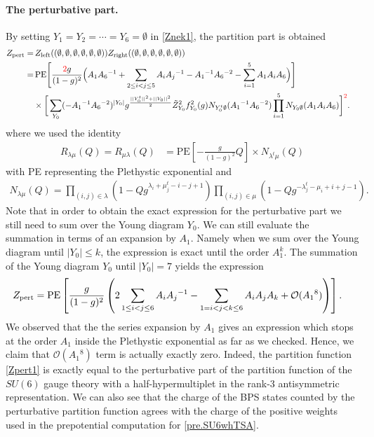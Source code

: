 \documentclass[11pt,a4paper]{article}
\newcommand{\nn}{\nonumber}
\begin{document}
\paragraph{The perturbative part.}
By setting $Y_1=Y_2=\cdots = Y_6 = \emptyset$ in  \eqref{Znek1}, the partition part is obtained 
\begin{align}
Z_{\rm pert} 
=& \,
Z_{\text{left}}( (\emptyset,\emptyset,\emptyset,\emptyset,\emptyset,\emptyset ) )
Z_{\text{right}}( (\emptyset,\emptyset,\emptyset,\emptyset,\emptyset,\emptyset ) )
\cr
=&\, 
\text{PE} \Biggl[ 
\frac{{\color{red}2}g}{(1-g)^2} 
\Bigl( A_1 A_6{}^{-1} 
+ \sum_{2 \le i <  j \le 5} A_i A_j{}^{-1}
- A_1{}^{-1} A_6{}^{-2} 
- \sum_{i=1}^5 A_1 A_i  A_6
\Bigr)
\Biggr]
\cr 
& 
\times \bigg[\sum_{Y_0} ( - A_1{}^{-1} A_6{}^{-2})^{|Y_0|} 
g^{\frac{||Y_0^t||^2+||Y_0||^2}{2}} \tilde{Z}_{Y_0}^2 f_{Y_0}^2(g)
N_{Y_0^t \emptyset } (A_1{}^{-1} A_6{}^{-2})\prod_{i=1}^5 N_{Y_0 \emptyset } (A_1 A_i  A_6)\bigg]^{\color{red}2} .\nn
\end{align}
where we used the identity
\begin{align}
R_{\lambda \mu} (Q)=R_{ \mu\lambda} (Q)
&= \text{PE} \left[ - \frac{g}{(1-g)^2} Q \right]
\times N_{\lambda^t \mu} (Q)
\end{align}
with PE representing the Plethystic exponential
 and 
\begin{align}
N_{\lambda \mu} (Q) 
= \prod_{(i,j) \in \lambda} \left( 1 - Q g^{\lambda_i + \mu_j^t -i-j+1} \right)
\prod_{(i,j) \in \mu} \left( 1 - Q g^{-\lambda^t_j - \mu_i + i + j - 1} \right).
\end{align}
Note that in order to obtain the exact expression for the perturbative part we still need to sum over the Young diagram $Y_0$. We can still evaluate the summation in terms of an expansion by $A_1$. Namely when we sum over the Young diagram until $|Y_0| \leq k$, the expression is exact until the order $A_1^k$. The summation of the Young diagram $Y_0$ until $|Y_0| = 7$ yields the expression  
\begin{align}
Z_{\rm pert} 
&= \text{PE}\left[\frac{g}{(1-g)^2} 
\left( 2\sum_{1 \le i < j \le 6} A_i A_j{}^{-1} 
- \sum_{1 = i < j < k \le 6} A_i A_j A_k
+ \mathcal{O} (A_1{}^8)\right)\right].\label{Zpert1}
\end{align} 
We observed that the the series expansion by $A_1$ gives an expression which stops at the order $A_1$ inside the Plethystic exponential as far as we checked. Hence, we claim that $\mathcal{O} (A_1{}^8)$ term is actually exactly zero. Indeed, the partition function \eqref{Zpert1} is exactly equal to the perturbative part of the partition function of the $SU(6)$ gauge theory with a half-hypermultiplet in the rank-3 antisymmetric representation. We can also see that the charge of the BPS states counted by the perturbative partition function agrees with the charge of the positive weights used in the prepotential computation for \eqref{pre.SU6whTSA}.
\end{document}
